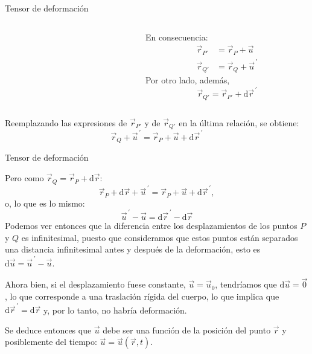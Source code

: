 \documentclass[11pt,handout,aspectratio=1610]{beamer}
\newcommand{\diff}[0]{\text{d}}
\newcommand{\vs}{\vspace{11pt}}
\begin{document}
\begin{frame}{Tensor de deformación}
\begin{columns}
\begin{column}{0.45\textwidth}
\begin{figure}
\begin{tikzpicture}
                \end{tikzpicture}
            \end{figure}
        \end{column}
        \begin{column}{0.45\textwidth}
            En consecuencia:
            \begin{align*}
                \vec{r}_{P'} &= \vec{r}_P + \vec{u} \\
                \vec{r}_{Q'} &= \vec{r}_Q + \vec{u}^{\, \prime}
            \end{align*} Por otro lado, además, $$ \vec{r}_{Q'} = \vec{r}_{P'} + \diff \vec{r}^{\, \prime} $$
        \end{column}
    \end{columns}

    Reemplazando las expresiones de $\vec{r}_{P'}$ y de $\vec{r}_{Q'}$ en la última relación, se obtiene: $$ \vec{r}_Q + \vec{u}^{\, \prime} = \vec{r}_P + \vec{u} + \diff \vec{r}^{\, \prime} $$

\end{frame}

\begin{frame}{Tensor de deformación}

    Pero como $ \vec{r}_Q = \vec{r}_P + \diff \vec{r}$: $$ \vec{r}_P + \diff \vec{r} + \vec{u}^{\, \prime} = \vec{r}_P + \vec{u} + \diff \vec{r}^{\, \prime}, $$ o, lo que es lo mismo: $$ \vec{u}^{\, \prime} - \vec{u}= \diff \vec{r}^{\, \prime} - \diff \vec{r} $$ Podemos ver entonces que la diferencia entre los desplazamientos de los puntos $P$ y $Q$ es infinitesimal, puesto que consideramos que estos puntos están separados una distancia infinitesimal antes y después de la deformación, esto es $\diff \vec{u} = \vec{u}^{\, \prime} - \vec{u} $.

    \vs

    Ahora bien, si el desplazamiento fuese constante, $\vec{u} = \vec{u}_0$, tendríamos que $\diff \vec{u} = \vec{0}$, lo que corresponde a una traslación rígida del cuerpo, lo que implica que $\diff \vec{r}^{\, \prime} = \diff \vec{r}$ y, por lo tanto, no habría deformación.

    \vs

    Se deduce entonces que $\vec{u}$ debe ser una función de la posición del punto $\vec{r}$ y posiblemente del tiempo: $\vec{u} = \vec{u} \left(\vec{r},t\right)$.

\end{frame}
\end{document}

